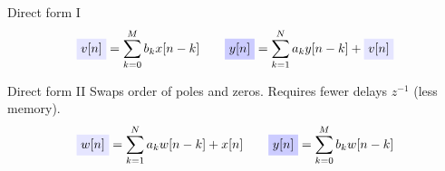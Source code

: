 \documentclass[10pt, handout]{beamer}
\begin{document}
\begin{frame}{Direct form I}
	\begin{equation*}
	\tikz[baseline]{\node[fill=blue!10,anchor=base] {$v[n]$};} = \sum_{k = 0}^{M}b_kx[n-k] \qquad \tikz[baseline]{\node[fill=blue!20,anchor=base] {$y[n]$};} = \sum_{k = 1}^{N}a_ky[n-k] + \tikz[baseline]{\node[fill=blue!10,anchor=base] {$v[n]$};}
	\end{equation*}
\begin{center}
		\resizebox{0.7\textwidth}{!}{}
\end{center}
\end{frame}

\begin{frame}{Direct form II}
	Swaps order of poles and zeros. Requires fewer delays $z^{-1}$ (less memory).
	\begin{equation*}
	\tikz[baseline]{\node[fill=blue!10,anchor=base] {$w[n]$};} = \sum_{k = 1}^{N}a_kw[n-k] + x[n] \qquad \tikz[baseline]{\node[fill=blue!20,anchor=base] {$y[n]$};} = \sum_{k = 0}^{M}b_kw[n-k]
	\end{equation*}
	\begin{center}
		\resizebox{0.55\textwidth}{!}{}
	\end{center}
\end{frame}
\end{document}
